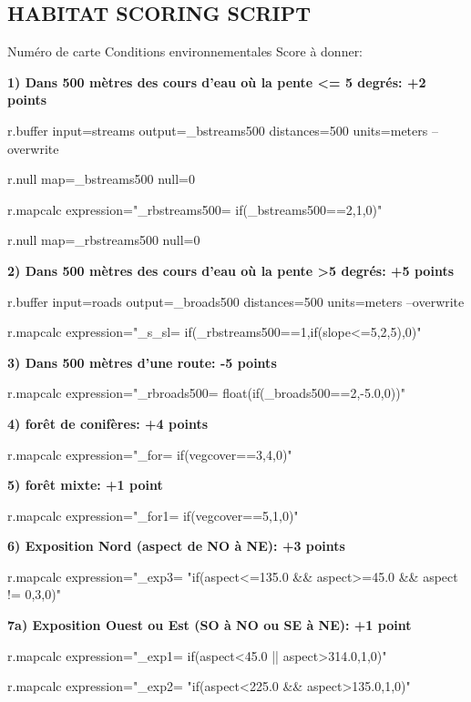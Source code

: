 \subsection{HABITAT SCORING SCRIPT}

Num\'ero de carte Conditions environnementales Score \`a donner:

\noindent \textbf{
1) Dans 500 m\`etres des cours d'eau o\`u la pente <= 5 degr\'es: +2 points}
\begin{smallverbatim}
r.buffer input=streams output=_bstreams500
 distances=500 units=meters --overwrite

r.null map=_bstreams500 null=0

r.mapcalc expression="_rbstreams500=
if(_bstreams500==2,1,0)"

r.null map=_rbstreams500 null=0
\end{smallverbatim}

\noindent \textbf{
2) Dans 500 m\`etres des cours d'eau o\`u la pente >5 degr\'es: +5 points}
\begin{smallverbatim}
r.buffer input=roads output=_broads500 
distances=500 units=meters --overwrite

r.mapcalc expression="_s_sl=
if(_rbstreams500==1,if(slope<=5,2,5),0)"
\end{smallverbatim}

\noindent \textbf{
3) Dans 500 m\`etres d'une route: -5 points}
\begin{smallverbatim}
r.mapcalc expression="_rbroads500=
float(if(_broads500==2,-5.0,0))"
\end{smallverbatim}

\noindent \textbf{
4) for\^et de conif\`eres: +4 points}
\begin{smallverbatim}
r.mapcalc expression="_for=
if(vegcover==3,4,0)"
\end{smallverbatim}

\noindent \textbf{
5) for\^et mixte: +1 point}
\begin{smallverbatim}
r.mapcalc expression="_for1=
if(vegcover==5,1,0)"
\end{smallverbatim}

\noindent \textbf{
6) Exposition Nord (aspect de NO \`a NE): +3 points}
\begin{smallverbatim}
r.mapcalc expression="_exp3=
"if(aspect<=135.0 && aspect>=45.0
 && aspect != 0,3,0)"
\end{smallverbatim}

\noindent \textbf{
7a) Exposition Ouest ou Est (SO \`a NO ou SE \`a NE): +1 point}
\begin{smallverbatim}
r.mapcalc expression="_exp1=
if(aspect<45.0 || aspect>314.0,1,0)"

r.mapcalc expression="_exp2=
"if(aspect<225.0 && aspect>135.0,1,0)"
\end{smallverbatim}


